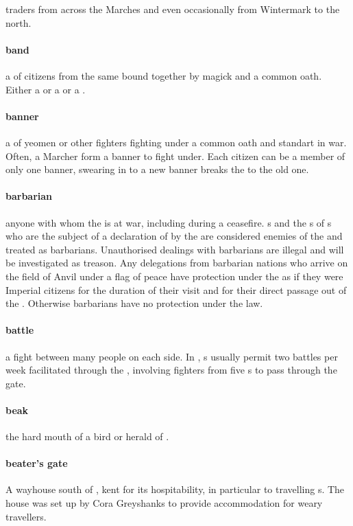 traders from across the Marches and even occasionally from Wintermark to the north. 
\paragraph{band} a  of citizens from the same  bound together by magick and a common oath. Either a  or a  or a .
\paragraph{banner} a  of yeomen or other fighters fighting under a common oath and standart in war. Often, a Marcher  form a banner to fight under. Each citizen can be a member of only one banner, swearing in to a new banner breaks the  to the old one. 
\paragraph{barbarian} anyone with whom the  is at war, including during a ceasefire. s and the s of s who are the subject of a declaration of  by the  are considered enemies of the  and treated as barbarians. Unauthorised dealings with barbarians are illegal and will be investigated as treason. Any delegations from barbarian nations who arrive on the field of Anvil under a flag of peace have protection under the  as if they were Imperial citizens for the duration of their visit and for their direct passage out of the . Otherwise barbarians have no protection under the law.
\paragraph{battle} a fight between many people on each side. In , s usually permit two battles per week facilitated through the , involving fighters from five s to pass through the gate.
\paragraph{beak} the hard mouth of a bird or herald of .
\paragraph{beater's gate} A wayhouse south of , kent for its hospitability, in particular to travelling s. The house was set up by Cora Greyshanks to provide accommodation for weary travellers.
